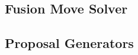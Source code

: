 \documentclass[10pt,twocolumn,letterpaper]{article}
\DeclareMathOperator*{\argmin}{arg\,min}
\begin{document}






\subsection{Fusion Move Solver}







\subsection{Proposal Generators}
\end{document}
